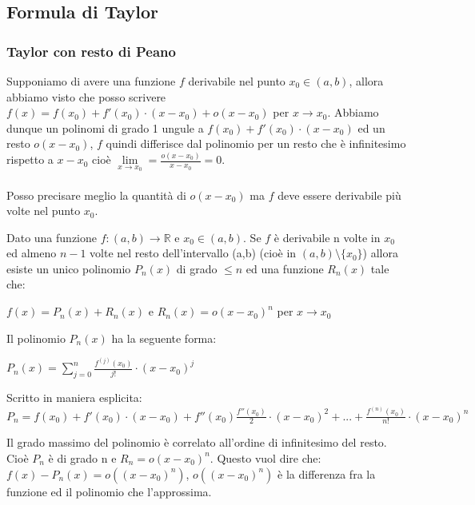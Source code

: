 \subsection{Formula di Taylor}
\subsubsection{Taylor con resto di Peano}
Supponiamo di avere una funzione $f$ derivabile nel punto $x_0 \in (a,b)$, allora abbiamo visto che posso scrivere $f(x) = f(x_0) + f'(x_0) \cdot (x-x_0) + o(x - x_0)$ per $x\to x_0$. Abbiamo dunque un polinomi di grado 1 ungule a $f(x_0) + f'(x_0) \cdot (x-x_0)$ ed un resto $o(x - x_0)$, $f$ quindi differisce dal polinomio per un resto che è infinitesimo rispetto a $x- x_0$ cioè $\lim\limits_{x\to x_0} = \frac{o(x - x_0)}{x - x_0} = 0$.\\\\
Posso precisare meglio la quantità di $o(x - x_0)$ ma $f$ deve essere derivabile più volte nel punto $x_0$.

\begin{definition}
Dato una funzione $f:(a,b) \to \mathbb{R}$ e $x_0 \in (a,b)$. Se $f$ è derivabile n volte in $x_0$ ed almeno $n-1$ volte nel resto dell'intervallo (a,b) (cioè in $(a,b) \setminus \{x_0\}$) allora esiste un unico polinomio $P_n(x)$ di grado $\leq n$ ed una funzione $R_n(x)$ tale che:
\begin{center}
    $f(x) = P_n(x) + R_n(x)$ e $R_n(x) = o(x - x_0)^n$ per $x\to x_0$
\end{center}
Il polinomio $P_n(x)$ ha la seguente forma:
\begin{center}\vspace{-5pt}
    $P_n(x) = \sum\limits_{j=0}^n \frac{f^{(j)}(x_0)}{j!} \cdot (x - x_0)^j$
\end{center}
\end{definition}

Scritto in maniera esplicita:\\
$P_n = f(x_0) + f'(x_0) \cdot (x - x_0) + f''(x_0)\frac{f''(x_0)}{2} \cdot (x-x_0)^2 + ... + \frac{f^{(n)}(x_0)}{n!} \cdot (x - x_0)^n$

\begin{observation}
Il grado massimo del polinomio è correlato all'ordine di infinitesimo del resto. Cioè $P_n$ è di grado n e $R_n = o(x - x_0)^n$. Questo vuol dire che: $f(x) - P_n(x) = o((x-x_0)^n)$, $o((x-x_0)^n)$ è la differenza fra la funzione ed il polinomio che l'approssima.
\end{observation}

